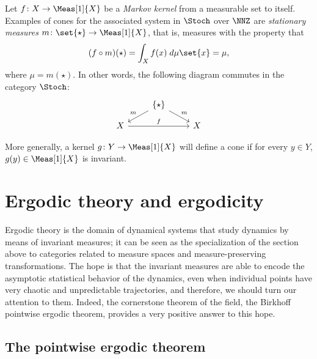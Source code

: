 \documentclass[../main]{subfiles}
\begin{document}
\begin{example}
  Let \(f \colon X \to \Meas[1]{X}\) be a \emph{Markov kernel} from a measurable set to itself. Examples of cones for the associated system in \(\Stoch\) over \(\NNZ\) are \emph{stationary measures} \(m \colon \set{\star} \to \Meas[1]{X}\), that is, measures with the property that 
  \begin{equation*}
    (f \circ m)(\star) =  \int_X f(x) \;d\mu\set{x} = \mu,
  \end{equation*}
  where \(\mu = m(\star)\). In other words, the following diagram commutes in the category \(\Stoch\):
  \[
    \begin{tikzcd}
      &\arrow[dl, "m", swap]\{\star\}\arrow[dr, "m"]& \\[-10pt]
      X\arrow[rr,"f"] && X
    \end{tikzcd}
  \]
\end{example}

More generally, a kernel \(g \colon Y \to \Meas[1]{X}\) will define a cone if for every \(y \in Y\), \(g(y) \in \Meas[1]{X}\) is invariant.


\section{Ergodic theory and ergodicity}
Ergodic theory is the domain of dynamical systems that study dynamics by means of invariant measures; it can be seen as the specialization of the section above to categories related to measure spaces and measure-preserving transformations. The hope is that the invariant measures are able to encode the asymptotic statistical behavior of the dynamics, even when individual points have very chaotic and unpredictable trajectories, and therefore, we should turn our attention to them. Indeed, the cornerstone theorem of the field, the Birkhoff pointwise ergodic theorem, provides a very positive answer to this hope.

\subsection{The pointwise ergodic theorem}
\end{document}

